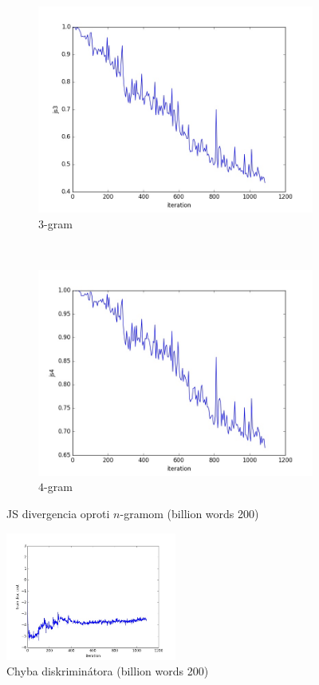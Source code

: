 \documentclass[10pt,a4paper]{article}
\begin{document}
\begin{figure}[H]
    \begin{subfigure}[b]{0.4\textwidth}
        \includegraphics[width=\textwidth]{cuted_small/js3}
        \caption{$3$-gram}
    \end{subfigure}
    ~ 
    \begin{subfigure}[b]{0.4\textwidth}
        \includegraphics[width=\textwidth]{cuted_small/js4}
        \caption{$4$-gram}
    \end{subfigure}
    \caption{JS divergencia oproti $n$-gramom (billion words 200)}\label{fig:animals}
\end{figure}
\begin{figure}[H]
	\centering
	\includegraphics[width=0.5\textwidth]{cuted_small/train_disc_cost}
    \caption{Chyba diskriminátora (billion words 200) }
\end{figure}
\end{document}
